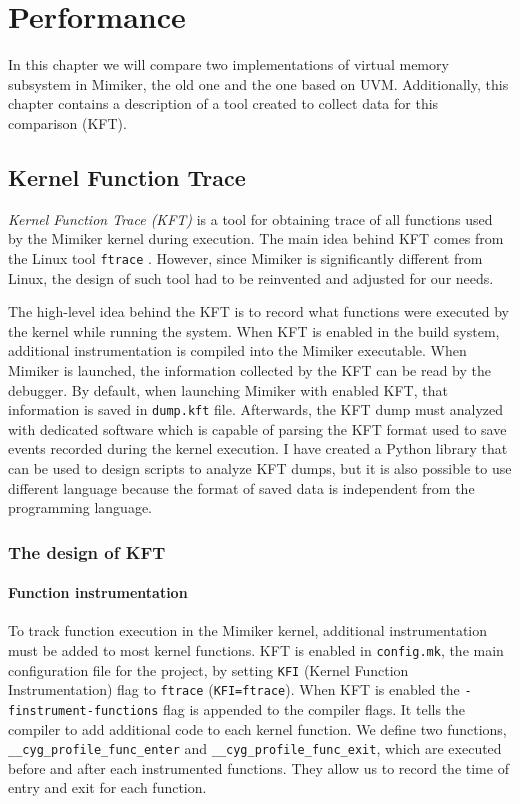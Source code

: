 \chapter{Performance}
\label{chapter:performance}

In this chapter we will compare two implementations of virtual memory subsystem in Mimiker, the old one and the one based on UVM.
Additionally, this chapter contains a description of a tool created to collect data for this comparison (KFT).

\section{Kernel Function Trace}

{\it Kernel Function Trace (KFT)} is a tool for obtaining trace of all functions used by the Mimiker kernel during execution.
The main idea behind KFT comes from the Linux tool {\tt ftrace} \cite{ftrace}.
However, since Mimiker is significantly different from Linux, the design of such tool had to be reinvented and adjusted for our needs.

The high-level idea behind the KFT is to record what functions were executed by the kernel while running the system.
When KFT is enabled in the build system, additional instrumentation is compiled into the Mimiker executable.
When Mimiker is launched, the information collected by the KFT can be read by the debugger.
By default, when launching Mimiker with enabled KFT, that information is saved in {\tt dump.kft} file.
Afterwards, the KFT dump must analyzed with dedicated software which is capable of parsing the KFT format used to save events recorded during the kernel execution.
I have created a Python library that can be used to design scripts to analyze KFT dumps, but it is also possible to use different language because the format
of saved data is independent from the programming language.

\subsection{The design of KFT}

\subsubsection{Function instrumentation}

To track function execution in the Mimiker kernel, additional instrumentation must be added to most kernel functions.
KFT is enabled in {\tt config.mk}, the main configuration file for the project,
by setting {\tt KFI} (Kernel Function Instrumentation) flag to {\tt ftrace} ({\tt KFI=ftrace}).
When KFT is enabled the {\tt -finstrument-functions} flag is appended to the compiler flags.
It tells the compiler to add additional code to each kernel function.
We define two functions, \texttt{__cyg_profile_func_enter} and \texttt{__cyg_profile_func_exit}, which are executed before and after each instrumented functions.
They allow us to record the time of entry and exit for each function.

